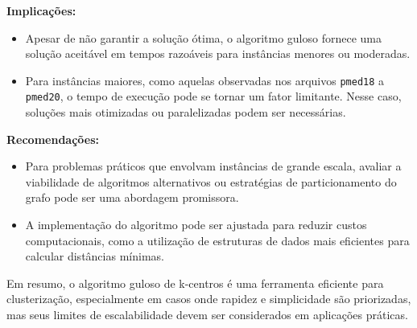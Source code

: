 \documentclass[10pt,conference]{IEEEtran}
\begin{document}
\textbf{Implicações:}
\begin{itemize}
    \item Apesar de não garantir a solução ótima, o algoritmo guloso fornece uma solução aceitável em tempos razoáveis para instâncias menores ou moderadas.
    \item Para instâncias maiores, como aquelas observadas nos arquivos \texttt{pmed18} a \texttt{pmed20}, o tempo de execução pode se tornar um fator limitante. Nesse caso, soluções mais otimizadas ou paralelizadas podem ser necessárias.
\end{itemize}

\textbf{Recomendações:}
\begin{itemize}
    \item Para problemas práticos que envolvam instâncias de grande escala, avaliar a viabilidade de algoritmos alternativos ou estratégias de particionamento do grafo pode ser uma abordagem promissora.
    \item A implementação do algoritmo pode ser ajustada para reduzir custos computacionais, como a utilização de estruturas de dados mais eficientes para calcular distâncias mínimas.
\end{itemize}

Em resumo, o algoritmo guloso de k-centros é uma ferramenta eficiente para clusterização, especialmente em casos onde rapidez e simplicidade são priorizadas, mas seus limites de escalabilidade devem ser considerados em aplicações práticas.

\newpage





\end{document}
